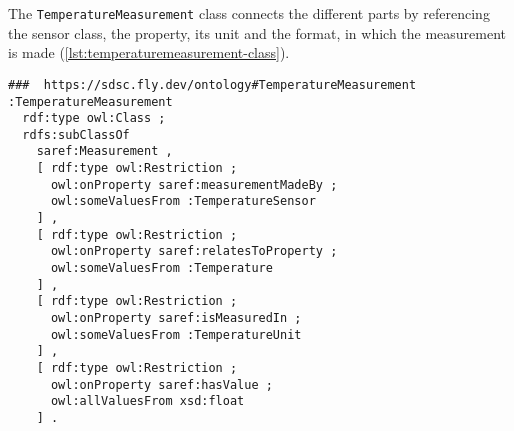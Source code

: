 The \lstinline|TemperatureMeasurement| class connects the different parts by referencing the sensor class, the property, its unit and the format, in which the measurement is made (\autoref{lst:temperaturemeasurement-class}).

\begin{lstlisting}[language=turtle,caption={{\ttfamily{}TemperatureMeasurement} class},label={lst:temperaturemeasurement-class}]
###  https://sdsc.fly.dev/ontology#TemperatureMeasurement
:TemperatureMeasurement
  rdf:type owl:Class ;
  rdfs:subClassOf
    saref:Measurement ,
    [ rdf:type owl:Restriction ;
      owl:onProperty saref:measurementMadeBy ;
      owl:someValuesFrom :TemperatureSensor
    ] ,
    [ rdf:type owl:Restriction ;
      owl:onProperty saref:relatesToProperty ;
      owl:someValuesFrom :Temperature
    ] ,
    [ rdf:type owl:Restriction ;
      owl:onProperty saref:isMeasuredIn ;
      owl:someValuesFrom :TemperatureUnit
    ] ,
    [ rdf:type owl:Restriction ;
      owl:onProperty saref:hasValue ;
      owl:allValuesFrom xsd:float
    ] .
\end{lstlisting}
